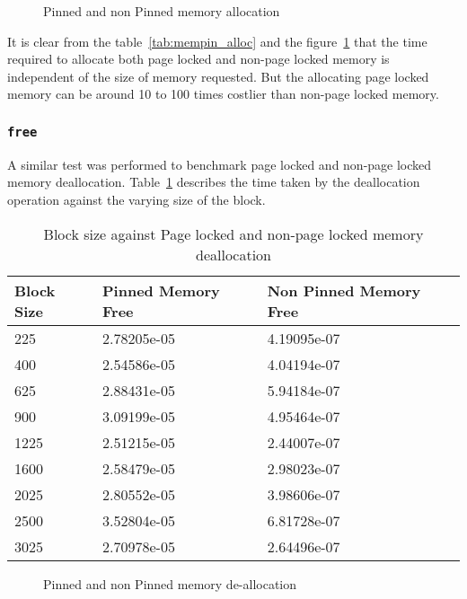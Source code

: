 \begin{figure}[h]
  
  \caption{Pinned and non Pinned memory allocation}
  \label{fig:mempin_alloc}
\end{figure}

It is clear from the table~\ref{tab:mempin_alloc} and the figure~\ref{fig:mempin_alloc}
that the time required to allocate both page locked and non-page locked memory
is independent of the size of memory requested. But the allocating page locked
memory can be around 10 to 100 times costlier than non-page locked memory.

\subsubsection{\texttt{free}}
A similar test was performed to benchmark page locked and non-page locked memory
deallocation. Table~\ref{tab:mempin_free} describes the time taken by the deallocation
operation against the varying size of the block.

\begin{table}[h]
  \centering
  \caption{Block size against Page locked and non-page locked memory deallocation}
  \begin{tabular}{l l l}
    \hline
    Block Size & Pinned Memory Free & Non Pinned Memory Free \\
    \hline
    225        & 2.78205e-05        & 4.19095e-07            \\
    400        & 2.54586e-05        & 4.04194e-07            \\
    625        & 2.88431e-05        & 5.94184e-07            \\
    900        & 3.09199e-05        & 4.95464e-07            \\
    1225       & 2.51215e-05        & 2.44007e-07            \\
    1600       & 2.58479e-05        & 2.98023e-07            \\
    2025       & 2.80552e-05        & 3.98606e-07            \\
    2500       & 3.52804e-05        & 6.81728e-07            \\
    3025       & 2.70978e-05        & 2.64496e-07            \\
    \hline
  \end{tabular}
  \label{tab:mempin_free}
\end{table}

\begin{figure}[h]
  
  \caption{Pinned and non Pinned memory de-allocation}
  \label{fig:mempin_free}
\end{figure}

